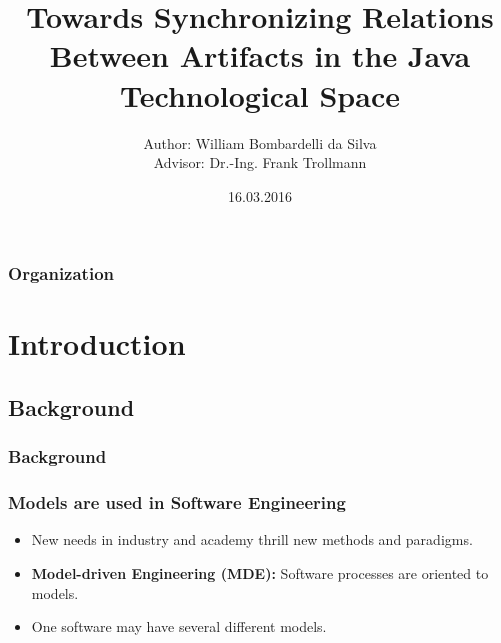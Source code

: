 \documentclass{beamer}
\title[Synchronizing Relations in Java]{Towards Synchronizing Relations Between Artifacts in the Java Technological Space} %
\author[William]{
\vskip 12pt
Author: William Bombardelli da Silva\\
Advisor: Dr.-Ing. Frank Trollmann} %
\institute[TU Berlin] %
{
\vskip 12pt
Technische Universität Berlin \\ %
Fakultät IV Elektrotechnik und Informatik \\
Bachelorstudiengang Informatik \\
\medskip
\textit{wbombardellis@win.tu-berlin.de} %
}
\date{16.03.2016} %
\begin{document}
\begin{frame}
	\titlepage %
\end{frame}

\begin{frame}
	\frametitle{Organization} %
	\tableofcontents %
\end{frame}


\section{Introduction} %
\subsection{Background}
\begin{frame}
	\frametitle{Background}
\end{frame}

\begin{frame}
	\frametitle{Models are used in Software Engineering}
	\begin{itemize}
		\item New needs in industry and academy thrill new methods and paradigms.
		\item \textbf{Model-driven Engineering (MDE):} Software processes are oriented to models.
		\item One software may have several different models.
	\end{itemize}
\end{frame}
\end{document}

